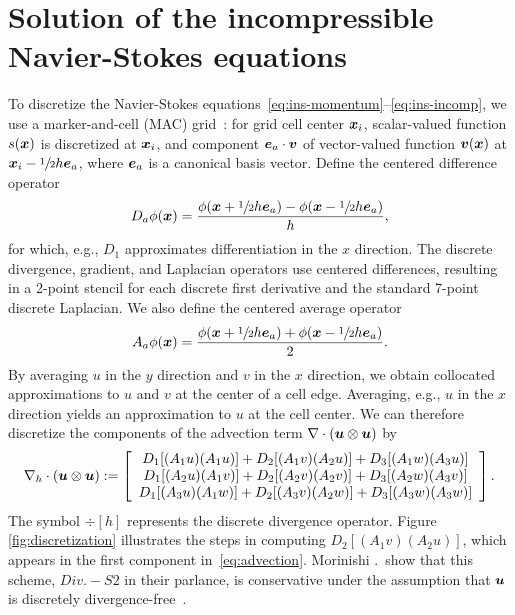 \section{Solution of the incompressible Navier-Stokes equations}\label{sec:ins}



To discretize the Navier-Stokes equations~\eqref{eq:ins-momentum}--\eqref{eq:ins-incomp},
we use a marker-and-cell (MAC) grid~\cite{Welch:1965jv}: for grid cell center $\boldsymbol{x}_i$,
scalar-valued function $s(\boldsymbol{x})$ is discretized at $\boldsymbol{x}_i$, and component $\boldsymbol{e}_a\cdot\boldsymbol{v}$
of vector-valued function $\boldsymbol{v}(\boldsymbol{x})$ at $\boldsymbol{x}_i - \sfrac12h\boldsymbol{e}_a$, where $\boldsymbol{e}_a$ is a
canonical basis vector. Define the centered difference operator
\begin{equation*}
    D_a\phi(\boldsymbol{x}) = \frac{\phi(\boldsymbol{x}+\sfrac12 h\boldsymbol{e}_a) - \phi(\boldsymbol{x}-\sfrac12 h\boldsymbol{e}_a)}{h},
\end{equation*}
for which, e.g., $D_1$ approximates differentiation in the $x$ direction. The discrete
divergence, gradient, and Laplacian operators use centered differences, resulting in a
2-point stencil for each discrete first derivative and the standard 7-point discrete
Laplacian. We also define the centered average operator
\begin{equation*}
    A_a\phi(\boldsymbol{x}) = \frac{\phi(\boldsymbol{x}+\sfrac12 h\boldsymbol{e}_a) + \phi(\boldsymbol{x}-\sfrac12 h\boldsymbol{e}_a)}2.
\end{equation*}
By averaging $u$ in the $y$ direction and $v$ in the $x$ direction, we obtain collocated
approximations to $u$ and $v$ at the center of a cell edge. Averaging, e.g., $u$ in the
$x$ direction yields an approximation to $u$ at the cell center. We can therefore
discretize the components of the advection term $\div(\u\otimes\u)$ by
\begin{equation}\label{eq:advection}
    \div[h](\u\otimes\u) := %
    \left[\begin{array}{c}
        D_1[(A_1 u) (A_1 u)] + D_2[(A_1 v) (A_2 u)] + D_3[(A_1 w) (A_3 u)] \\
        D_1[(A_2 u) (A_1 v)] + D_2[(A_2 v) (A_2 v)] + D_3[(A_2 w) (A_3 v)] \\
        D_1[(A_3 u) (A_1 w)] + D_2[(A_3 v) (A_2 w)] + D_3[(A_3 w) (A_3 w)]
    \end{array}\right].
\end{equation}
The symbol $\div[h]$ represents the discrete divergence operator.  Figure~%
\ref{fig:discretization} illustrates the steps in computing $D_2[(A_1 v)(A_2 u)]$, which
appears in the first component in~\eqref{eq:advection}. Morinishi .\ show
that this scheme, $Div. - S2$ in their parlance, is conservative under the assumption
that $\boldsymbol{u}$ is discretely divergence-free~\cite{Morinishi:1998us}.

